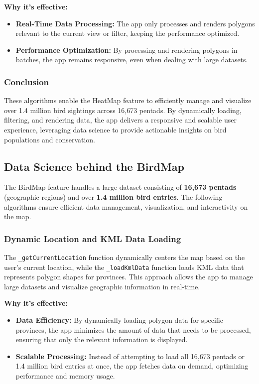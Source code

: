 \documentclass[a4paper]{article}
\begin{document}
\textbf{Why it's effective:}
\begin{itemize}
    \item \textbf{Real-Time Data Processing:} The app only processes and renders polygons relevant to the current view or filter, keeping the performance optimized.
    \item \textbf{Performance Optimization:} By processing and rendering polygons in batches, the app remains responsive, even when dealing with large datasets.
\end{itemize}

\subsubsection{Conclusion}
These algorithms enable the HeatMap feature to efficiently manage and visualize over 1.4 million bird sightings across 16,673 pentads. By dynamically loading, filtering, and rendering data, the app delivers a responsive and scalable user experience, leveraging data science to provide actionable insights on bird populations and conservation.

\subsection{Data Science behind the BirdMap}

The BirdMap feature handles a large dataset consisting of \textbf{16,673 pentads} (geographic regions) and over \textbf{1.4 million bird entries}. The following algorithms ensure efficient data management, visualization, and interactivity on the map.

\subsubsection{Dynamic Location and KML Data Loading}
The \texttt{\_getCurrentLocation} function dynamically centers the map based on the user's current location, while the \texttt{\_loadKmlData} function loads KML data that represents polygon shapes for provinces. This approach allows the app to manage large datasets and visualize geographic information in real-time.

\textbf{Why it's effective:}
\begin{itemize}
    \item \textbf{Data Efficiency:} By dynamically loading polygon data for specific provinces, the app minimizes the amount of data that needs to be processed, ensuring that only the relevant information is displayed.
    \item \textbf{Scalable Processing:} Instead of attempting to load all 16,673 pentads or 1.4 million bird entries at once, the app fetches data on demand, optimizing performance and memory usage.
\end{itemize}
\end{document}
